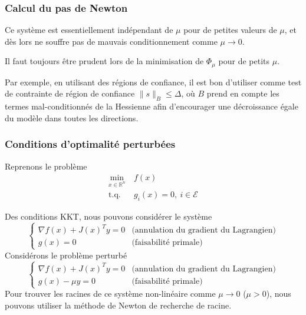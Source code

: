 \documentclass[t,usepdftitle=false,aspectratio=169]{beamer}
\def\cE{\mathcal{E}}
\def\RR{\mathbb{R}}
\begin{document}
\begin{frame}
\frametitle{Calcul du pas de Newton}

Ce système est essentiellement indépendant de $\mu$ pour de petites valeurs de $\mu$, et dès lors ne souffre pas de mauvais conditionnement comme $\mu \rightarrow 0$.

\mbox{}

Il faut toujours être prudent lors de la minimisation de
$\Phi_{\mu}$ pour de petits $\mu$.

\mbox{}

Par exemple, en utilisant des régions de confiance, il est bon d'utiliser comme test de contrainte de région de confiance $\| s \|_B \leq \Delta$, où $B$ prend en compte les termes mal-conditionnés de la Hessienne afin d'encourager une décroissance égale du modèle dans toutes les directions.

\end{frame}

\begin{frame}
\frametitle{Conditions d'optimalité perturbées}

Reprenons le problème
\begin{align*}
\min_{x \in \RR^n}\ & f(x) \\
\mbox{t.q. } &g_i(x) = 0,\ i \in \cE
\end{align*}

Des conditions KKT, nous pouvons considérer le système
$$
\begin{cases}
\nabla f(x) + J(x)^Ty = 0 & \mbox{(annulation du gradient du Lagrangien)} \\
g(x) = 0 & \mbox{(faisabilité primale)}
\end{cases}
$$
Considérons le problème perturbé
$$
\begin{cases}
\nabla f(x) + J(x)^Ty = 0 & \mbox{(annulation du gradient du Lagrangien)} \\
g(x) - \mu y = 0 & \mbox{(faisabilité primale)}
\end{cases}
$$
Pour trouver les racines de ce système non-linéaire comme $\mu \rightarrow 0$ ($\mu > 0$), nous pouvons utiliser la méthode de Newton de recherche de racine.

\end{frame}
\end{document}
